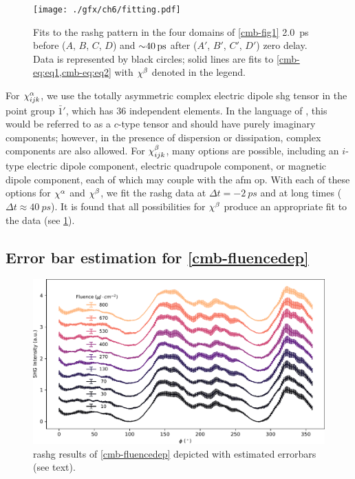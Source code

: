 \begin{landscape}
\begin{figure}
\centering
\texttt{[image: ./gfx/ch6/fitting.pdf]}
\caption[Fits to the \gls{rashg} pattern in the four domains of \cref{cmb-fig1} \qty{2.0}{ps} before ($A$, $B$, $C$, $D$) and $\apx \qty{40}{ps}$ after ($A'$, $B'$, $C'$, $D'$) zero delay]{
\label{cmb-fitting}
Fits to the \gls{rashg} pattern in the four domains of \cref{cmb-fig1} \qty{2.0}{ps} before ($A$, $B$, $C$, $D$) and $\apx \qty{40}{ps}$ after ($A'$, $B'$, $C'$, $D'$) zero delay.
Data is represented by black circles; solid lines are fits to \cref{cmb-eq:eq1,cmb-eq:eq2} with $\chi^\beta$ denoted in the legend.
}
\end{figure}
\end{landscape}

For $\chi^\alpha_{ijk}$, we use the totally asymmetric complex electric dipole \gls{shg} tensor in the point group $\bar{1}'$, which has $36$ independent elements.
In the language of \citet{birss}, this would be referred to as a $c$-type tensor and should have purely imaginary components; however, in the presence of dispersion or dissipation, complex components are also allowed.
For $\chi^\beta_{ijk}$, many options are possible, including an $i$-type electric dipole component, electric quadrupole component, or magnetic dipole component, each of which may couple with the \gls{afm} \gls{op}.
With each of these options for $\chi^\alpha$ and $\chi^\beta$, we fit the \gls{rashg} data at $\Delta t=\qty{-2}{ps}$ and at long times ($\Delta t\approx \qty{40}{ps}$).
It is found that all possibilities for $\chi^\beta$ produce an appropriate fit to the data (see \cref{cmb-fitting}).

\subsection{Error bar estimation for \cref{cmb-fluencedep}}

\begin{figure}
\centering
\includegraphics[width=\textwidth]{./gfx/ch6/errorbars.pdf}
\caption{\label{cmb-errorbars}\gls{rashg} results of \cref{cmb-fluencedep} depicted with estimated errorbars (see text).}
\end{figure}

